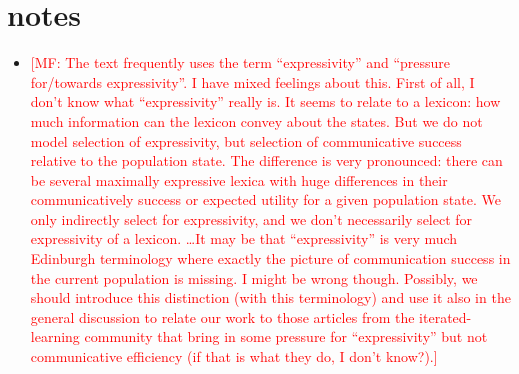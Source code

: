 \documentclass[a4paper, 11pt]{article}
\theoremstyle{Satz}
\newcommand{\mf}[1]{\textcolor{Red}{[MF: #1]}}
\begin{document}



\newpage

\appendix


\section{notes}

\begin{itemize}
\item \mf{The text frequently uses the term ``expressivity'' and ``pressure for/towards
    expressivity''. I have mixed feelings about this. First of all, I don't know what
    ``expressivity'' really is. It seems to relate to a lexicon: how much information can the
    lexicon convey about the states. But we do not model selection of expressivity, but
    selection of communicative success relative to the population state. The difference is very
    pronounced: there can be several maximally expressive lexica with huge differences in their
    communicatively success or expected utility for a given population state. We only
    indirectly select for expressivity, and we don't necessarily select for expressivity of a
    lexicon. \dots It may be that ``expressivity'' is very much Edinburgh terminology where
    exactly the picture of communication success in the current population is missing. I might
    be wrong though. Possibly, we should introduce this distinction (with this terminology) and
    use it also in the general discussion to relate our work to those articles from the
    iterated-learning community that bring in some pressure for ``expressivity'' but not
    communicative efficiency (if that is what they do, I don't know?).}
\end{itemize}
\end{document}
